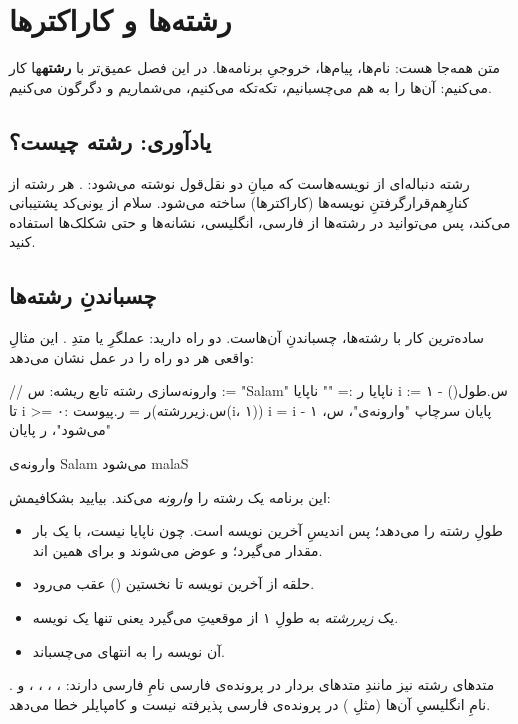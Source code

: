 \chapter{رشته‌ها و کاراکترها}%
\label{ch:strings}

متن همه‌جا هست: نام‌ها، پیام‌ها، خروجیِ برنامه‌ها. در این فصل عمیق‌تر با
\textbf{رشته}ها کار می‌کنیم: آن‌ها را به هم می‌چسبانیم، تکه‌تکه می‌کنیم،
می‌شماریم و دگرگون می‌کنیم.

\section{یادآوری: رشته چیست؟}

رشته دنباله‌ای از نویسه‌هاست که میانِ دو نقل‌قول نوشته می‌شود:
. هر رشته از کنارِ‌هم‌قرارگرفتنِ نویسه‌ها (کاراکترها) ساخته
می‌شود. سلام از یونی‌کد پشتیبانی می‌کند، پس می‌توانید در رشته‌ها از فارسی،
انگلیسی، نشانه‌ها و حتی شکلک‌ها استفاده کنید.

\section{چسباندنِ رشته‌ها}

ساده‌ترین کار با رشته‌ها، چسباندنِ آن‌هاست. دو راه دارید: عملگرِ \code{+} یا
متدِ . این مثالِ واقعی هر دو راه را در عمل نشان می‌دهد:

\begin{salamfa}
// وارونه‌سازی رشته
تابع ریشه:
    س := "Salam"
    ناپایا ر := ""
    ناپایا i := س.طول() - ۱
    تا i >= ۰:
        ر = ر.پیوست(س.زیررشته(i، ۱))
        i = i - ۱
    پایان
    سرچاپ "وارونه‌ی"، س، "می‌شود"، ر
پایان
\end{salamfa}

\begin{progoutfa}
وارونه‌ی Salam می‌شود malaS
\end{progoutfa}

این برنامه یک رشته را \emph{وارونه} می‌کند. بیایید بشکافیمش:
\begin{itemize}
  \item {} طولِ رشته را می‌دهد؛ پس  اندیسِ آخرین
        نویسه است. چون  ناپایا نیست، با \code{:=} یک بار مقدار
        می‌گیرد؛  و  عوض می‌شوند و برای همین اند.
  \item حلقه از آخرین نویسه تا نخستین () عقب می‌رود.
  \item {} یک
        \emph{زیررشته} به طولِ ۱ از موقعیتِ  می‌گیرد یعنی تنها
        یک نویسه.
  \item {} آن نویسه را به انتهای
         می‌چسباند.
\end{itemize}
\begin{note}
متدهای رشته نیز مانندِ متدهای بردار در پرونده‌ی فارسی نامِ فارسی دارند:
، ، ، ،  و
. نامِ انگلیسیِ آن‌ها (مثلِ ) در پرونده‌ی فارسی
پذیرفته نیست و کامپایلر خطا می‌دهد.
\end{note}

